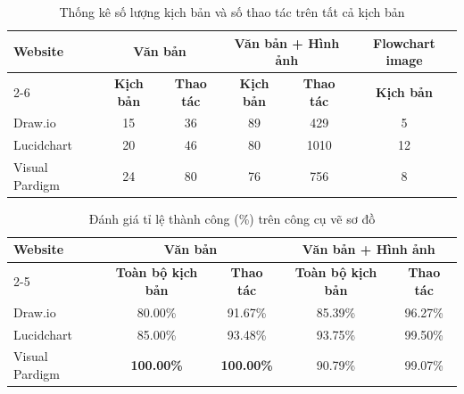 \documentclass[a4paper, 12pt]{report}
\begin{document}
{\begin{table}[H]
\centering
\caption{Thống kê số lượng kịch bản và số thao tác trên tất cả kịch bản}
\label{tab:thong_ke_2}
\begin{tabular}{|l|c|c|c|c|c|}
\hline
\multirow{2}{*}{\textbf{Website}} & \multicolumn{2}{c|}{\textbf{Văn bản}} & \multicolumn{2}{c|}{\textbf{Văn bản + Hình ảnh}} & \textbf{Flowchart image} \\
\cline{2-6}
 & \textbf{Kịch bản} & \textbf{Thao tác} & \textbf{Kịch bản} & \textbf{Thao tác} & \textbf{Kịch bản} \\
\hline
Draw.io & 15 & 36 & 89 & 429 & 5 \\
\hline
Lucidchart & 20 & 46 & 80 & 1010 & 12 \\
\hline
Visual Pardigm & 24 & 80 & 76 & 756 & 8 \\
\hline
\end{tabular}
\end{table}





\begin{table}[H]
\centering
\caption{Đánh giá tỉ lệ thành công (\%) trên công cụ vẽ sơ đồ}
\label{tab:drawio}
\begin{tabular}{|l|c|c|c|c|}
\hline
\multirow{2}{*}{\textbf{Website}} & \multicolumn{2}{c|}{\textbf{Văn bản}} & \multicolumn{2}{c|}{\textbf{Văn bản + Hình ảnh}} \\
\cline{2-5}
 & \textbf{Toàn bộ kịch bản} & \textbf{Thao tác} & \textbf{Toàn bộ kịch bản} & \textbf{Thao tác} \\
\hline
Draw.io & 80.00\% & 91.67\% & 85.39\% & 96.27\% \\
\hline
Lucidchart & 85.00\% & 93.48\% & 93.75\% & 99.50\% \\
\hline
Visual Pardigm & \textbf{100.00\%} & \textbf{100.00\%} & 90.79\% & 99.07\% \\
\hline
\end{tabular}
\end{table}







}
\end{document}
